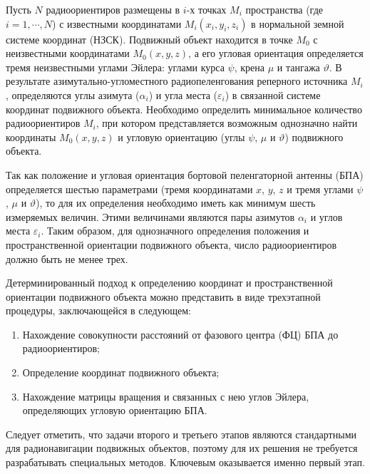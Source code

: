 \documentclass[../main.tex]{subfiles}
\begin{document}
\renewcommand{\figurename}{Рисунок}
Пусть $N$ радиоориентиров размещены в $i$-х точках $M_i$ пространства (где $i = 1, \cdots, N$) с известными
координатами $M_i\left(x_i, y_i, z_i\right)$ в нормальной земной системе координат (НЗСК). Подвижный объект
находится в точке $M_0$ с неизвестными координатами $M_0\left(x, y, z\right)$, а его угловая ориентация
определяется тремя неизвестными углами Эйлера: углами курса $\psi$, крена $\mu$ и тангажа $\vartheta$.
В результате азимутально-угломестного радиопеленгования реперного источника $M_i$, определяются углы
азимута ($\alpha_i$) и угла места ($\varepsilon_i$) в связанной системе координат подвижного объекта. Необходимо
определить минимальное количество радиоориентиров $M_i$, при котором представляется возможным однозначно найти
координаты $M_0\left(x, y, z\right)$ и угловую ориентацию (углы $\psi$, $\mu$ и $\vartheta$) подвижного
объекта.

Так как положение и угловая ориентация бортовой пеленгаторной антенны (БПА) определяется шестью параметрами
(тремя координатами $x$, $y$, $z$ и тремя углами $\psi$, $\mu$ и $\vartheta$), то для их определения необходимо
иметь как минимум шесть измеряемых величин. Этими величинами являются пары азимутов $\alpha_i$ и углов места
$\varepsilon_i$. Таким образом, для однозначного определения положения и пространственной ориентации подвижного
объекта, число радиоориентиров должно быть не менее трех.

Детерминированный подход к определению координат и пространственной ориентации подвижного объекта можно представить
в виде трехэтапной процедуры, заключающейся в следующем:
\begin{enumerate}
    \item Нахождение совокупности расстояний от фазового центра (ФЦ) БПА до радиоориентиров;
    \item Определение координат подвижного объекта;
    \item Нахождение матрицы вращения и связанных с нею углов Эйлера, определяющих угловую ориентацию БПА.
\end{enumerate}

Следует отметить, что задачи второго и третьего этапов являются стандартными для радионавигации подвижных объектов, поэтому для их решения не требуется разрабатывать специальных методов. Ключевым оказывается именно первый этап.
\end{document}
